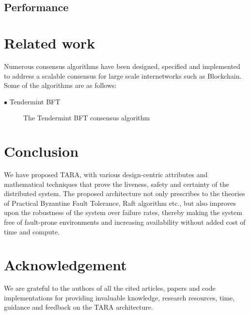 \documentclass[]{article}
\begin{document}
\subsection{Performance}

\section{Related work}
Numerous consensus algorithms have been designed, specified and implemented to address a scalable consensus for large scale internetworks such as Blockchain. Some of the algorithms are as follows:
\begin{description}
	\item[$\bullet$ Tendermint BFT] The Tendermint BFT consensus algorithm
\end{description}

\section{Conclusion}
We have proposed TARA, with various design-centric attributes and mathematical techniques that prove the liveness, safety and certainty of the distributed system. The proposed architecture not only prescribes to the theories of Practical Byzantine Fault Tolerance, Raft algorithm etc., but also improves upon the robustness of the system over failure rates, thereby making the system free of fault-prone environments and increasing availability without added cost of time and compute.

\section{Acknowledgement}
We are grateful to the authors of all the cited articles, papers and code implementations for providing invaluable knowledge, research resources, time, guidance and feedback on the TARA architecture.

 

\end{document}
